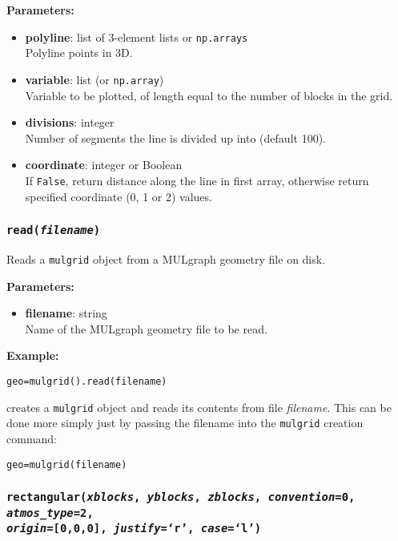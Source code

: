 \textbf{Parameters:}
\begin{itemize}
\item \textbf{polyline}: list of 3-element lists or \texttt{np.arrays}\\
  Polyline points in 3D.
\item \textbf{variable}: list (or \texttt{np.array})\\
  Variable to be plotted, of length equal to the number of blocks in the grid.
\item \textbf{divisions}: integer\\
  Number of segments the line is divided up into (default 100).
\item \textbf{coordinate}: integer or Boolean\\
  If \texttt{False}, return distance along the line in first array, otherwise return specified coordinate (0, 1 or 2) values.
\end{itemize}

\subsubsection{\texttt{read(\emph{filename})}}

Reads a \texttt{mulgrid} object from a MULgraph geometry file on disk.

\textbf{Parameters:}
\begin{itemize}
\item \textbf{filename}: string\\
  Name of the MULgraph geometry file to be read.
\end{itemize}

\textbf{Example:}

\begin{verbatim}
geo=mulgrid().read(filename)
\end{verbatim}

creates a \texttt{mulgrid} object and reads its contents from file \emph{filename}.  This can be done more simply just by passing the filename into the \texttt{mulgrid} creation command:

\begin{verbatim}
geo=mulgrid(filename)
\end{verbatim}

\subsubsection{\texttt{rectangular(\emph{xblocks}, \emph{yblocks}, \emph{zblocks}, \emph{convention}=0, \emph{atmos\_type}=2,\\
    \emph{origin}=[0,0,0], \emph{justify}=`r', \emph{case}=`l')}}


